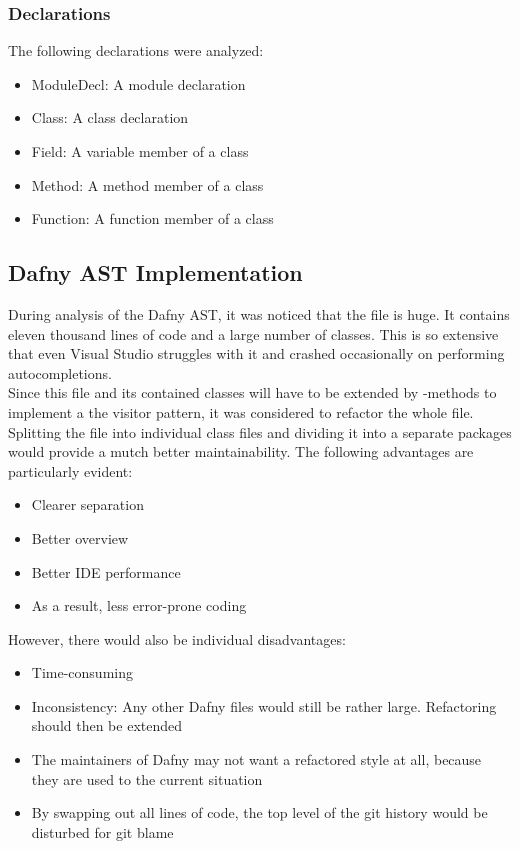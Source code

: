 \subsubsection{Declarations}
The following declarations were analyzed:
\begin{itemize}
    \item ModuleDecl: A module declaration
    \item Class: A class declaration
    \item Field: A variable member of a class
    \item Method: A method member of a class
    \item Function: A function member of a class
\end{itemize}



\subsection{Dafny AST Implementation}
During analysis of the Dafny AST, it was noticed that the file  is huge. It contains eleven thousand lines of code and a large number of classes. This is so extensive that even Visual Studio struggles with it and crashed occasionally on performing autocompletions.\\

Since this file and its contained classes will have to be extended by -methods
to implement a the visitor pattern, it was considered to refactor the whole file. \\

Splitting the file into individual class files and dividing it into a separate packages would provide a mutch better maintainability. The following advantages are particularly evident:
\begin{itemize}
    \item Clearer separation
    \item Better overview
    \item Better IDE performance
    \item As a result, less error-prone coding
\end{itemize}

However, there would also be individual disadvantages:
\begin{itemize}
    \item Time-consuming
    \item Inconsistency: Any other Dafny files would still be rather large. Refactoring should then be extended
    \item The maintainers of Dafny may not want a refactored style at all, because they are used to the current situation
    \item By swapping out all lines of code, the top level of the git history would be disturbed for git blame
\end{itemize}


